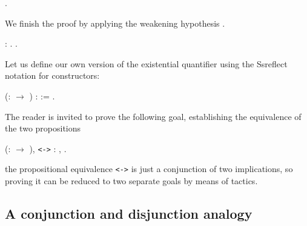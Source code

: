\begin{coqdoccode}
\coqdocemptyline
\coqdocnoindent
{} .\coqdoceol
\coqdocemptyline
\end{coqdoccode}
We finish the proof  by applying the weakening hypothesis . \begin{coqdoccode}
\coqdocemptyline
\coqdocnoindent
{} : .\coqdoceol
\coqdocemptyline
\coqdocnoindent
{}.\coqdoceol
\coqdocemptyline
\end{coqdoccode}
\begin{exercise}


Let us define our own version  of the existential quantifier
using the Ssreflect notation for constructors:


\begin{coqdoccode}
\coqdocemptyline
\coqdocnoindent
{}   (:  \ensuremath{\rightarrow} ) :  :=     .\coqdoceol
\coqdocemptyline
\end{coqdoccode}


The reader is invited to prove the following goal, establishing the
equivalence of the two propositions


\begin{coqdoccode}
\coqdocemptyline
\coqdocnoindent
{} \coqdockw{\ensuremath{\forall}}  (:  \ensuremath{\rightarrow} ),    \texttt{<->}  : ,  .\coqdoceol
\coqdocemptyline
\end{coqdoccode}


\hint the propositional equivalence \texttt{<->} is just a conjunction of
two implications, so proving it can be reduced to two separate goals
by means of  tactics.


\begin{coqdoccode}
\coqdocemptyline
\coqdocemptyline
\end{coqdoccode}


\end{exercise}


\subsection{A conjunction and disjunction analogy}




